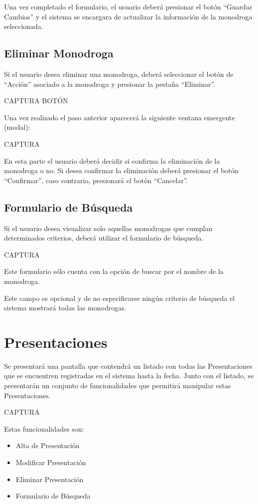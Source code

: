 \documentclass[letterpaper,10pt,spanish]{sphinxmanual}
\begin{document}
Una vez completado el formulario, el usuario deberá presionar el botón “Guardar Cambios” y el sistema se encargara de actualizar la información de la monodroga seleccionada.


\subsection{Eliminar Monodroga}
\label{monodrogas:eliminar-monodroga}
Si el usuario desea eliminar una monodroga, deberá seleccionar el botón de “Acción” asociado a la monodroga y presionar la pestaña “Eliminar”.

CAPTURA BOTÓN

Una vez realizado el paso anterior aparecerá la siguiente ventana emergente (modal):

CAPTURA

En esta parte el usuario deberá decidir si confirma la eliminación de la monodroga o no. Si desea confirmar la eliminación deberá presionar el botón “Confirmar”, caso contrario, presionará el botón “Cancelar”.


\subsection{Formulario de Búsqueda}
\label{monodrogas:formulario-de-busqueda}
Si el usuario desea visualizar solo aquellas monodrogas que cumplan determinados criterios, deberá utilizar el formulario de búsqueda.

CAPTURA

Este formulario sólo cuenta con la opción de buscar por el nombre de la monodroga.

Este campo es opcional y de no especificarse ningún criterio de búsqueda el sistema mostrará todas las monodrogas.


\section{Presentaciones}
\label{presentaciones::doc}\label{presentaciones:presentaciones}
Se presentará una pantalla que contendrá un listado con todas las Presentaciones que se encuentren registradas en el sistema hasta la fecha. Junto con el listado, se presentarán un conjunto de funcionalidades que permitirá manipular estas Presentaciones.

CAPTURA

Estas funcionalidades son:
\begin{itemize}
\item {} 
Alta de Presentación

\item {} 
Modificar Presentación

\item {} 
Eliminar Presentación

\item {} 
Formulario de Búsqueda

\end{itemize}
\end{document}
